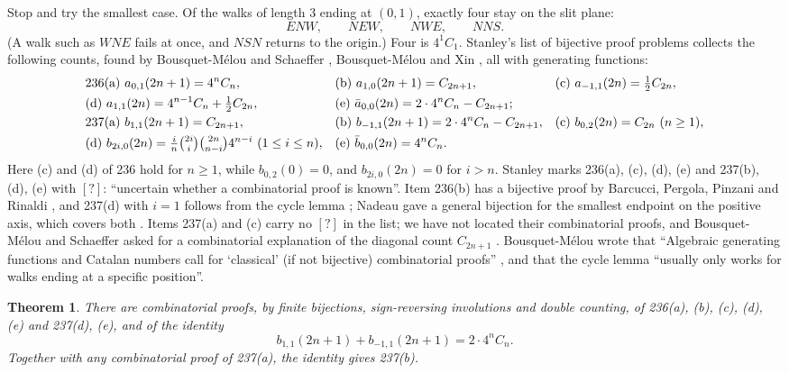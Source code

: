 \documentclass[11pt]{amsart}
\newtheorem{theorem}{Theorem}
\theoremstyle{definition}
\theoremstyle{remark}
\newcommand{\abar}{\bar a}
\newcommand{\bbar}{\bar b}
\begin{document}
Stop and try the smallest case. Of the walks of length $3$ ending at $(0,1)$, exactly four stay on the slit plane:
\[
  ENW,\qquad NEW,\qquad NWE,\qquad NNS .
\]
(A walk such as $WNE$ fails at once, and $NSN$ returns to the origin.) Four is $4^1C_1$. Stanley's list of bijective
proof problems \cite[Problems 236, 237]{Bij} collects the following counts, found by Bousquet-M\'elou and Schaeffer
\cite{BMS}, Bousquet-M\'elou \cite{BM} and Xin \cite{Xin}, all with generating functions:
\begin{align*}
  &\text{236(a) } a_{0,1}(2n+1)=4^nC_n, &&\text{(b) } a_{1,0}(2n+1)=C_{2n+1}, &&\text{(c) } a_{-1,1}(2n)=\tfrac12C_{2n},\\
  &\text{(d) } a_{1,1}(2n)=4^{n-1}C_n+\tfrac12C_{2n}, &&\text{(e) } \abar_{0,0}(2n)=2\cdot4^nC_n-C_{2n+1};\\
  &\text{237(a) } b_{1,1}(2n+1)=C_{2n+1}, &&\text{(b) } b_{-1,1}(2n+1)=2\cdot4^nC_n-C_{2n+1}, &&\text{(c) } b_{0,2}(2n)=C_{2n}\ (n\ge1),\\
  &\text{(d) } b_{2i,0}(2n)=\tfrac in\tbinom{2i}i\tbinom{2n}{n-i}4^{n-i}\ (1\le i\le n), &&\text{(e) } \bbar_{0,0}(2n)=4^nC_n.
\end{align*}
Here (c) and (d) of 236 hold for $n\ge1$, while $b_{0,2}(0)=0$, and $b_{2i,0}(2n)=0$ for $i>n$. Stanley marks 236(a), (c), (d), (e) and 237(b), (d), (e) with $[?]$:
``uncertain whether a combinatorial proof is known''. Item 236(b) has a bijective proof by Barcucci, Pergola, Pinzani
and Rinaldi \cite{BPPR}, and 237(d) with $i=1$ follows from the cycle lemma \cite[Prop.~7]{BM}; Nadeau gave a general bijection for the
smallest endpoint on the positive axis, which covers both \cite{Nad}. Items 237(a) and (c)
carry no $[?]$ in the list; we have not located their combinatorial proofs, and Bousquet-M\'elou and Schaeffer asked
for a combinatorial explanation of the diagonal count $C_{2n+1}$ \cite[remark after Thm.~8]{BMS}. Bousquet-M\'elou wrote
that ``Algebraic generating functions and Catalan numbers call for `classical' (if not bijective) combinatorial
proofs'' \cite[Sect.~1]{BM}, and that the cycle lemma ``usually only works for walks ending at a specific
position''.

\begin{theorem}\label{thm:main}
There are combinatorial proofs, by finite bijections, sign-reversing involutions and double counting, of 236(a), (b),
(c), (d), (e) and 237(d), (e), and of the identity
\[
  b_{1,1}(2n+1)+b_{-1,1}(2n+1)=2\cdot4^nC_n .
\]
Together with any combinatorial proof of 237(a), the identity gives 237(b).
\end{theorem}
\end{document}
